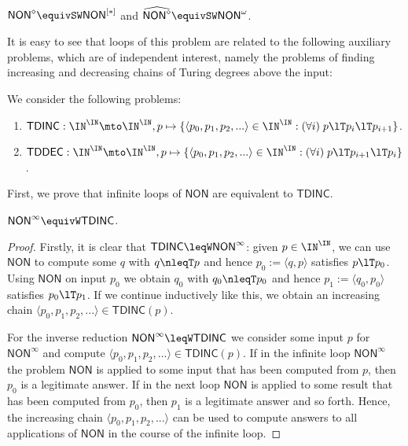 \documentclass{lmcs}
\def\TDINC{\mathsf{TDINC}}
\def\TDDEC{\mathsf{TDDEC}}
\def\NON{\mathsf{NON}}
\begin{document}
\begin{cor}
\label{cor:NON}
$\NON^\diamond\equivSW\NON^{[*]}$ and $\widehat{\NON^\diamond}\equivSW \NON^\omega$.
\end{cor}

\noindent
It is easy to see that loops of this problem are related to the following auxiliary problems, which are of independent interest,
namely the problems of finding increasing and decreasing chains of Turing degrees above the input:

\begin{defi}
We consider the following problems:
\begin{enumerate}
\item $\TDINC:\IN^\IN\mto\IN^\IN,p\mapsto\{\langle p_0,p_1,p_2,...\rangle\in\IN^\IN:(\forall i)\;p\lT p_i\lT p_{i+1}\}$.
\item $\TDDEC:\IN^\IN\mto\IN^\IN,p\mapsto\{\langle p_0,p_1,p_2,...\rangle\in\IN^\IN:(\forall i)\;p\lT p_{i+1}\lT p_{i}\}$.
\end{enumerate}
\end{defi}

\noindent
First, we prove that infinite loops of $\NON$ are equivalent to $\TDINC$.

\begin{prop}
\label{prop:TDINC}
$\NON^\infty\equivW\TDINC$.
\end{prop}
\begin{proof}
Firstly, it is clear that $\TDINC\leqW\NON^\infty$: given $p\in\IN^\IN$, we can use $\NON$
to compute some $q$ with $q\nleqT p$ and hence $p_0:=\langle q,p\rangle$ satisfies $p\lT p_0$.
Using $\NON$ on input $p_0$ we obtain $q_0$ with $q_0\nleqT p_0$ and hence $p_1:=\langle q_0,p_0\rangle$
satisfies $p_0\lT p_1$. If we continue inductively like this, we obtain an increasing chain $\langle p_0,p_1,p_2,...\rangle\in\TDINC(p)$.

For the inverse reduction $\NON^\infty\leqW\TDINC$ we consider some input $p$ for $\NON^\infty$
and compute $\langle p_0,p_1,p_2,...\rangle\in\TDINC(p)$. If in the infinite loop $\NON^\infty$ the
problem $\NON$ is applied to some input that has been computed from $p$, then $p_0$ is a legitimate answer.
If in the next loop $\NON$ is applied to some result that has been computed from $p_0$, then $p_1$ is a 
legitimate answer and so forth. Hence, the increasing chain $\langle p_0,p_1,p_2,...\rangle$ can be used
to compute answers to all applications of $\NON$ in the course of the infinite loop. 
\end{proof}
\end{document}
